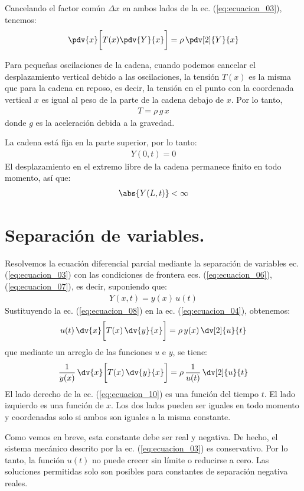 Cancelando el factor común $\Delta x$ en ambos lados de la ec. (\ref{eq:ecuacion_03}), tenemos:
\begin{align}
\pdv{x} \bigg[ T (x) \pdv{Y}{x} \bigg] = \rho \, \pdv[2]{Y}{x}
\label{eq:ecuacion_04}
\end{align}

Para pequeñas oscilaciones de la cadena, cuando podemos cancelar el desplazamiento vertical debido a las oscilaciones, la tensión $T (x)$ es la misma que para la cadena en reposo, es decir, la tensión en el punto con la coordenada vertical $x$ es igual al peso de la parte de la cadena debajo de $x$. Por lo tanto,
\begin{align}
T = \rho \, g \, x
\label{eq:ecuacion_05}
\end{align}
donde $g$ es la aceleración debida a la gravedad.
\par
La cadena está fija en la parte superior, por lo tanto:
\begin{align}
Y (0, t) = 0
\label{eq:ecuacion_06}
\end{align}
El desplazamiento en el extremo libre de la cadena permanece finito en todo momento, así que:
\begin{align}
\abs{Y (L, t)} < \infty
\label{eq:ecuacion_07}
\end{align}

\section{Separación de variables.}

Resolvemos la ecuación diferencial parcial mediante la separación de variables ec. (\ref{eq:ecuacion_03}) con las condiciones de frontera ecs. (\ref{eq:ecuacion_06}), (\ref{eq:ecuacion_07}), es decir, suponiendo que:
\begin{align}
Y (x, t) = y (x) \, u (t)
\label{eq:ecuacion_08}
\end{align}
Sustituyendo la ec. (\ref{eq:ecuacion_08}) en la ec. (\ref{eq:ecuacion_04}), obtenemos:
\begin{align}
u (t) \, \dv{x} \bigg[ T (x) \, \dv{y}{x} \bigg] = \rho \, y (x) \, \dv[2]{u}{t}
\label{eq:ecuacion_09}
\end{align}
que mediante un arreglo de las funciones $u$ e $y$, se tiene:
\begin{align}
\dfrac{1}{y (x)} \, \dv{x} \bigg[ T (x) \, \dv{y}{x} \bigg] = \rho \, \dfrac{1}{u (t)} \, \dv[2]{u}{t}
\label{eq:ecuacion_10}
\end{align}
El lado derecho de la ec. (\ref{eq:ecuacion_10}) es una función del tiempo $t$. El lado izquierdo es una función de $x$. Los dos lados pueden ser iguales en todo momento y coordenadas solo si ambos son iguales a la misma constante.
\par
Como vemos en breve, esta constante debe ser real y negativa. De hecho, el sistema mecánico descrito por la ec. (\ref{eq:ecuacion_03}) es conservativo. Por lo tanto, la función $u (t)$ no puede crecer sin límite o reducirse a cero. Las soluciones permitidas solo son posibles para constantes de separación negativa reales.

